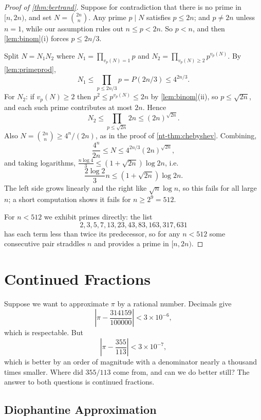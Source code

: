 \documentclass[a4paper]{scrartcl}
\begin{document}
\begin{proof}[Proof of \autoref{thm:bertrand}]
	Suppose for contradiction that there is no prime in $[n, 2n)$, and set $N = \binom{2n}n$. Any prime $p \mid N$ satisfies $p \leq 2n$; and $p \neq 2n$ unless $n = 1$, while our assumption rules out $n \leq p < 2n$. So $p < n$, and then \autoref{lem:binom}(i) forces $p \leq 2n/3$.

	Split $N = N_1N_2$ where $N_1 = \prod_{v_p(N) = 1}p$ and $N_2 = \prod_{v_p(N) \geq 2}p^{v_p(N)}$. By \autoref{lem:primeprod},
	$$
	N_1 \leq \prod_{p \leq 2n/3}p = P(2n/3) \leq 4^{2n/3}.
	$$
	For $N_2$: if $v_p(N) \geq 2$ then $p^2 \leq p^{v_p(N)} \leq 2n$ by \autoref{lem:binom}(ii), so $p \leq \sqrt{2n}$, and each such prime contributes at most $2n$. Hence
	$$
	N_2 \leq \prod_{p \leq \sqrt{2n}}2n \leq (2n)^{\sqrt{2n}}.
	$$
	Also $N = \binom{2n}n \geq 4^n/(2n)$, as in the proof of \autoref{nt-thm:chebyshev}. Combining,
	$$
	\frac{4^n}{2n} \leq N \leq 4^{2n/3}(2n)^{\sqrt{2n}},
	$$
	and taking logarithms, $\frac{n\log 4}{3} \leq (1 + \sqrt{2n})\log 2n$, i.e.
	$$
	\frac{2\log 2}{3}n \leq \left(1 + \sqrt{2n}\right)\log 2n.
	$$
	The left side grows linearly and the right like $\sqrt n \log n$, so this fails for all large $n$; a short computation shows it fails for $n \geq 2^9 = 512$.

	For $n < 512$ we exhibit primes directly: the list
	$$
	2, 3, 5, 7, 13, 23, 43, 83, 163, 317, 631
	$$
	has each term less than twice its predecessor, so for any $n < 512$ some consecutive pair straddles $n$ and provides a prime in $[n, 2n)$.
\end{proof}

\section{Continued Fractions}

Suppose we want to approximate $\pi$ by a rational number. Decimals give
$$
\left|\pi - \frac{314159}{100000}\right| < 3\times 10^{-6},
$$
which is respectable. But
$$
\left|\pi - \frac{355}{113}\right| < 3\times10^{-7},
$$
which is better by an order of magnitude with a denominator nearly a thousand times smaller. Where did $355/113$ come from, and can we do better still? The answer to both questions is continued fractions.

\subsection{Diophantine Approximation}
\end{document}
